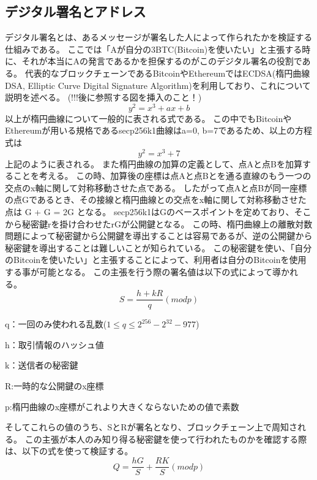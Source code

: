 \subsection{デジタル署名とアドレス}
デジタル署名とは、あるメッセージが署名した人によって作られたかを検証する仕組みである。
ここでは「Aが自分の3BTC(Bitcoin)を使いたい」と主張する時に、それが本当にAの発言であるかを担保するのがこのデジタル署名の役割である。
代表的なブロックチェーンであるBitcoinやEthereumではECDSA(楕円曲線DSA, Elliptic Curve Digital Signature Algorithm)を利用しており、これについて説明を述べる。
(!!!後に参照する図を挿入のこと！)
\begin{equation}
y^2 = x^3 + ax + b
\end{equation}
以上が楕円曲線について一般的に表される式である。
この中でもBitcoinやEthereumが用いる規格であるsecp256k1曲線はa=0, b=7であるため、以上の方程式は
\begin{equation}
y^2 = x^3 + 7
\end{equation}
上記のように表される。
また楕円曲線の加算の定義として、点Aと点Bを加算することを考える。
この時、加算後の座標は点Aと点Bとを通る直線のもう一つの交点のx軸に関して対称移動させた点である。
したがって点Aと点Bが同一座標の点Gであるとき、その接線と楕円曲線との交点をx軸に関して対称移動させた点は
G + G = 2G
となる。
secp256k1はGのベースポイントを定めており、そこから秘密鍵rを掛け合わせたrGが公開鍵となる。
この時、楕円曲線上の離散対数問題によって秘密鍵から公開鍵を導出することは容易であるが、逆の公開鍵から秘密鍵を導出することは難しいことが知られている。
この秘密鍵を使い、「自分のBitcoinを使いたい」と主張することによって、利用者は自分のBitcoinを使用する事が可能となる。
この主張を行う際の署名値は以下の式によって導かれる。
\begin{equation}
S=\frac{h+kR}{q}{(mod p)}
\end{equation}
\begin{list}{}{}
\item q：一回のみ使われる乱数(\(1 \leq q \leq 2^256-2^32-977\))
\item h：取引情報のハッシュ値
\item k：送信者の秘密鍵
\item R:一時的な公開鍵のx座標
\item p:楕円曲線のx座標がこれより大きくならないための値で素数
\end{list}

そしてこれらの値のうち、SとRが署名となり、ブロックチェーン上で周知される。
この主張が本人のみ知り得る秘密鍵を使って行われたものかを確認する際は、以下の式を使って検証する。
\begin{equation}
Q=\frac{hG}{S}+\frac{RK}{S}{(mod p)}
\end{equation}

